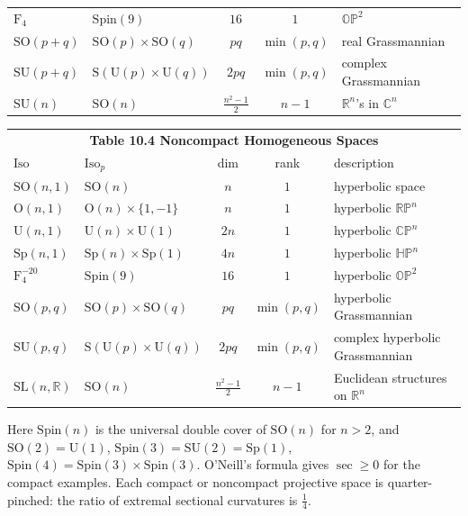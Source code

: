 \begin{definition}
\begin{center}
\begin{tabular}{l|l|c|c|l}
      $\mathrm F_4$ & $\mathrm{Spin}(9)$ & $16$ & $1$ & $\mathbb{OP}^2$\\
      $\mathrm{SO}(p{+}q)$ & $\mathrm{SO}(p)\times\mathrm{SO}(q)$ & $pq$ & $\min(p,q)$ & real Grassmannian\\
      $\mathrm{SU}(p{+}q)$ & $\mathrm S(\mathrm U(p)\times\mathrm U(q))$ & $2pq$ & $\min(p,q)$ & complex Grassmannian\\
      $\mathrm{SU}(n)$ & $\mathrm{SO}(n)$ & $\tfrac{n^2-1}2$ & $n-1$ & $\mathbb R^n$'s in $\mathbb C^n$
    \end{tabular}
  \end{center}
  \begin{center}
    \begin{tabular}{l|l|c|c|l}
      \multicolumn{5}{c}{\textbf{Table 10.4 Noncompact Homogeneous Spaces}}\\
      $\mathrm{Iso}$ & $\mathrm{Iso}_p$ & dim & rank & description\\\hline
      $\mathrm{SO}(n,1)$ & $\mathrm{SO}(n)$ & $n$ & $1$ & hyperbolic space\\
      $\mathrm O(n,1)$ & $\mathrm O(n)\times\{1,-1\}$ & $n$ & $1$ & hyperbolic $\mathbb{RP}^n$\\
      $\mathrm U(n,1)$ & $\mathrm U(n)\times\mathrm U(1)$ & $2n$ & $1$ & hyperbolic $\mathbb{CP}^n$\\
      $\mathrm{Sp}(n,1)$ & $\mathrm{Sp}(n)\times\mathrm{Sp}(1)$ & $4n$ & $1$ & hyperbolic $\mathbb{HP}^n$\\
      $\mathrm F_4^{-20}$ & $\mathrm{Spin}(9)$ & $16$ & $1$ & hyperbolic $\mathbb{OP}^2$\\
      $\mathrm{SO}(p,q)$ & $\mathrm{SO}(p)\times\mathrm{SO}(q)$ & $pq$ & $\min(p,q)$ & hyperbolic Grassmannian\\
      $\mathrm{SU}(p,q)$ & $\mathrm S(\mathrm U(p)\times\mathrm U(q))$ & $2pq$ & $\min(p,q)$ & complex hyperbolic Grassmannian\\
      $\mathrm{SL}(n,\mathbb R)$ & $\mathrm{SO}(n)$ & $\tfrac{n^2-1}2$ & $n-1$ & Euclidean structures on $\mathbb R^n$
    \end{tabular}
  \end{center}
  Here $\mathrm{Spin}(n)$ is the universal double cover of $\mathrm{SO}(n)$ for
  $n>2$, and
  $\mathrm{SO}(2)=\mathrm U(1)$, $\mathrm{Spin}(3)=\mathrm{SU}(2)=\mathrm{Sp}(1)$,
  $\mathrm{Spin}(4)=\mathrm{Spin}(3)\times\mathrm{Spin}(3)$. O'Neill's formula
  gives $\sec\ge0$ for the compact examples. Each compact or noncompact
  projective space is quarter-pinched: the ratio of extremal sectional
  curvatures is $\tfrac14$.
\end{definition}

